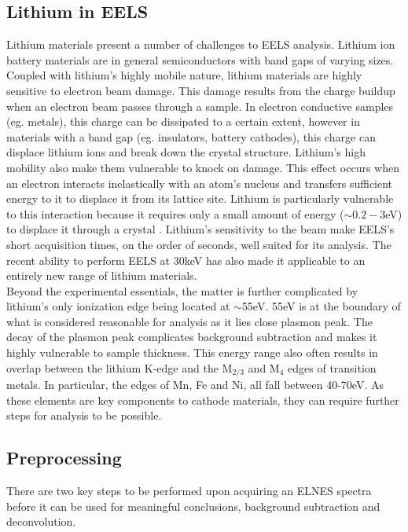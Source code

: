 \subsection{Lithium in EELS}
Lithium materials present a number of challenges to EELS analysis.  Lithium ion battery materials are in general semiconductors with band gaps of varying sizes. Coupled with lithium's highly mobile nature, lithium materials are highly sensitive to electron beam damage.  This damage results from the charge buildup when an electron beam passes through a sample.  In electron conductive samples (eg. metals), this charge can be dissipated to a certain extent, however in materials with a band gap (eg. insulators, battery cathodes), this charge can displace lithium ions and break down the crystal structure.  Lithium's high mobility also make them vulnerable to knock on damage.  This effect occurs when an electron interacts inelastically with an atom's nucleus and transfers sufficient energy to it to displace it from its lattice site.  Lithium is particularly vulnerable to this interaction because it requires only a small amount of energy ($ \sim 0.2-3$eV) to displace it through a crystal \cite{kang_factors_2006}.  Lithium's sensitivity to the beam make EELS's short acquisition times, on the order of seconds, well suited for its analysis.  The recent ability to perform EELS at 30keV has also made it applicable to an entirely new range of lithium materials.\\  Beyond the experimental essentials, the matter is further complicated by lithium's only ionization edge being located at $\mathrm{\sim}$55eV.  55eV is at the boundary of what is considered reasonable for analysis as it lies close plasmon peak. The decay of the plasmon peak complicates background subtraction and makes it highly vulnerable to sample thickness.  This energy range also often results in overlap between the lithium K-edge and the $\mathrm{M_{2 / 3}}$ and $\mathrm{M_4}$ edges of transition metals. In particular, the edges of Mn, Fe and Ni, all fall between 40-70eV.  As these elements are key components to cathode materials, they can require further steps for analysis to be possible.



\subsection{Preprocessing}

There are two key steps to be performed upon acquiring an ELNES spectra before it can be used for meaningful conclusions, background subtraction and deconvolution. 





